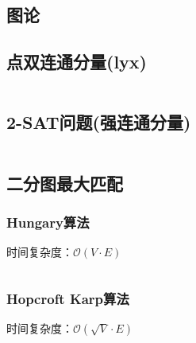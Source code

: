 \documentclass[landscape, twoside, a4paper]{article}
\newcommand{\cppcode}[1]{
	\inputminted[mathescape,
	frame=lines,linenos]{cpp}{source/#1}
}
\begin{document}
\begin{multicols}{2}
\begin{spacing}{0.8}
\section{图论}








\subsection{点双连通分量(lyx)}

\cppcode{graph-theory/pointtwo.cpp}




\subsection{2-SAT问题(强连通分量)}


\cppcode{graph-theory/two-satisfiability.cpp}


\subsection{二分图最大匹配}


\subsubsection{Hungary算法}


时间复杂度：$\mathcal{O}(V \cdot E)$


\cppcode{graph-theory/Hungarian.cpp}


\subsubsection{Hopcroft Karp算法}


时间复杂度：$\mathcal{O}(\sqrt{V} \cdot E)$


\cppcode{graph-theory/HK.cpp}



\end{spacing}
\end{multicols}
\end{document}
